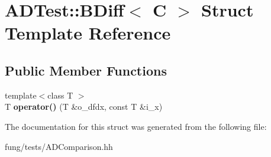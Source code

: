\hypertarget{structADTest_1_1BDiff}{\section{A\-D\-Test\-:\-:B\-Diff$<$ C $>$ Struct Template Reference}
\label{structADTest_1_1BDiff}
}
\subsection*{Public Member Functions}
\begin{DoxyCompactItemize}
\item 
\hypertarget{structADTest_1_1BDiff_a7c46d215eaaff2b7f9cc9aaf4a0c8899}{{\footnotesize template$<$class T $>$ }\\T {\bfseries operator()} (T \&o\-\_\-dfdx, const T \&i\-\_\-x)}\label{structADTest_1_1BDiff_a7c46d215eaaff2b7f9cc9aaf4a0c8899}

\end{DoxyCompactItemize}


The documentation for this struct was generated from the following file\-:\begin{DoxyCompactItemize}
\item 
fung/tests/A\-D\-Comparison.\-hh\end{DoxyCompactItemize}

